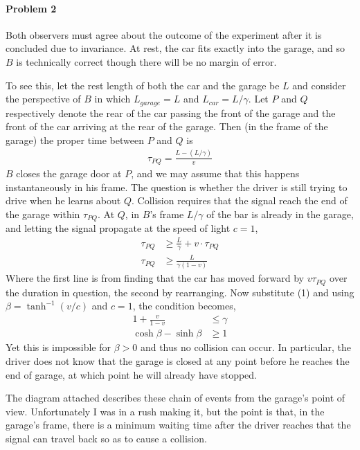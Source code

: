 \documentclass[10pt]{scrartcl}
\begin{document}
\paragraph{Problem 2} Both observers must agree about the outcome of the experiment after it is concluded due to invariance. At rest, the car fits exactly into the garage, and so $B$ is technically correct though there will be no margin of error. 

To see this, let the rest length of both the car and the garage be $L$ and consider the perspective of $B$ in which $L_{garage} = L$ and $L_{car} = L/\gamma$. Let $P$ and $Q$ respectively denote the rear of the car passing the front of the garage and the front of the car arriving at the rear of the garage. Then (in the frame of the garage) the proper time between $P$ and $Q$ is
\begin{align}\tau_{PQ} = \frac{L - (L/\gamma)}{v}\end{align}
 $B$ closes the garage door at $P$, and we may assume that this happens instantaneously in his frame. The question is whether the driver is still trying to drive when he learns about $Q$. Collision requires that the signal reach the end of the garage within $\tau_{PQ}$. At $Q$, in $B$'s frame $L/\gamma$ of the bar is already in the garage, and letting the signal propagate at the speed of light $c=1$,
\begin{align*}
	\tau_{PQ} &\geq \frac{L}{\gamma} + v\cdot\tau_{PQ}\\
	\tau_{PQ}&\geq \frac{L}{\gamma(1-v)}
\end{align*}
Where the first line is from finding that the car has moved forward by $v\tau_{PQ}$ over the duration in question, the second by rearranging. Now substitute (1) and using $\beta=\tanh^{-1}{(v/c)}$ and $c=1$, the condition becomes,
\begin{align}
1+\frac{v}{1-v}&\leq{\gamma}\\
\cosh{\beta}-\sinh{\beta}&\geq 1
\end{align}
Yet this is impossible for $\beta>0$ and thus no collision can occur. In particular, the driver does not know that the garage is closed at any point before he reaches the end of garage, at which point he will already have stopped. 

The diagram attached describes these chain of events from the garage's point of view. Unfortunately I was in a rush making it, but the point is that, in the garage's frame, there is a minimum waiting time after the driver reaches that the signal can travel back so as to cause a collision.  
\newpage
\end{document}

